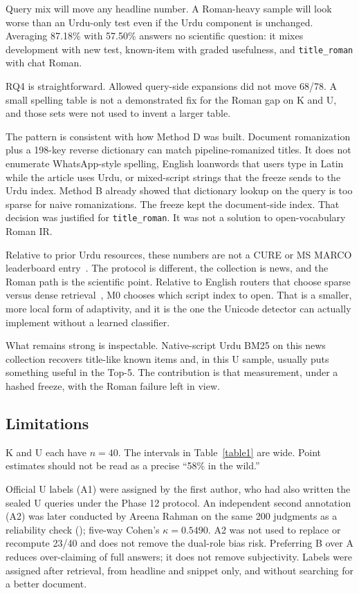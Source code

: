 \documentclass[10pt,letterpaper]{article}
\begin{document}
Query mix will move any headline number. A Roman-heavy sample will look worse than an Urdu-only test even if the Urdu component is unchanged. Averaging 87.18\% with 57.50\% answers no scientific question: it mixes development with new test, known-item with graded usefulness, and \texttt{title\_roman} with chat Roman.

RQ4 is straightforward. Allowed query-side expansions did not move 68/78. A small spelling table is not a demonstrated fix for the Roman gap on K and U, and those sets were not used to invent a larger table.

The pattern is consistent with how Method D was built. Document romanization plus a 198-key reverse dictionary can match pipeline-romanized titles. It does not enumerate WhatsApp-style spelling, English loanwords that users type in Latin while the article uses Urdu, or mixed-script strings that the freeze sends to the Urdu index. Method B already showed that dictionary lookup on the query is too sparse for naive romanizations. The freeze kept the document-side index. That decision was justified for \texttt{title\_roman}. It was not a solution to open-vocabulary Roman IR.

Relative to prior Urdu resources, these numbers are not a CURE or MS MARCO leaderboard entry~\cite{bib5,bib6}. The protocol is different, the collection is news, and the Roman path is the scientific point. Relative to English routers that choose sparse versus dense retrieval~\cite{bib11}, M0 chooses which script index to open. That is a smaller, more local form of adaptivity, and it is the one the Unicode detector can actually implement without a learned classifier.

What remains strong is inspectable. Native-script Urdu BM25 on this news collection recovers title-like known items and, in this U sample, usually puts something useful in the Top-5. The contribution is that measurement, under a hashed freeze, with the Roman failure left in view.

\subsection*{Limitations}

K and U each have $n = 40$. The intervals in Table~\ref{table1} are wide. Point estimates should not be read as a precise ``58\% in the wild.''

Official U labels (A1) were assigned by the first author, who had also written the sealed U queries under the Phase 12 protocol. An independent second annotation (A2) was later conducted by Areena Rahman on the same 200 judgments as a reliability check (); five-way Cohen's $\kappa = 0.5490$. A2 was not used to replace or recompute 23/40 and does not remove the dual-role bias risk. Preferring B over A reduces over-claiming of full answers; it does not remove subjectivity. Labels were assigned after retrieval, from headline and snippet only, and without searching for a better document.
\end{document}
